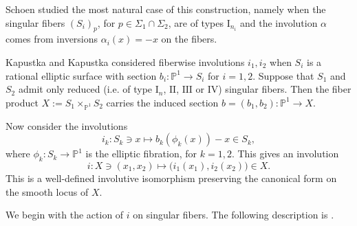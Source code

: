 \documentclass[a4paper]{amsart}
\theoremstyle{plain}
\theoremstyle{definition}
\theoremstyle{remark}
\numberwithin{equation}{section}
\newcommand{\PP}{\mathbb{P}}
\begin{document}
Schoen \cite{Schoen} studied the most natural case of this construction, namely
when the singular fibers $(S_{i})_{p}$, for $p\in\Sigma_{1}\cap\Sigma_{2}$, are of types $\mathrm{I}_{n_{i}}$ and the involution $\alpha$ comes from inversions $\alpha_{i}(x)= - x$ on the fibers.

Kapustka and Kapustka \cite{KK} considered fiberwise involutions $i_1,i_2$
when $S_i$ is a rational elliptic surface with section
$b_{i}\colon \PP^{1}\to S_{i}$ for $i=1,2$. Suppose that $S_{1}$ and $S_{2}$ admit only reduced (i.e. of type $\mathrm{I}_{n}$, $\mathrm{II}$, $\mathrm{III}$ or $\mathrm{IV}$)
singular fibers.
Then the fiber product $X:=S_{1}\times_{\PP^{1}} S_{2}$ carries the induced section
$b=(b_{1},b_{2})\colon \PP^{1}\to X$.

Now consider the involutions
\[
i_{k}\colon S_{k}\ni x\mapsto b_{k}(\phi_{k}(x))-x\in S_{k},
\]
where $\phi_{k}\colon S_{k}\to \PP^{1}$ is the elliptic fibration, for $k=1,2$.
This gives an involution
\[
i\colon X\ni (x_{1},x_{2})\mapsto \bigl(i_{1}(x_{1}),i_{2}(x_{2})\bigr)\in X.
\]
This is a well-defined involutive isomorphism preserving the canonical form
on the smooth locus of $X$.

We begin with the action of $i$ on singular fibers.  The following
description is \cite[Lemma~2.2]{KK}.
\end{document}
